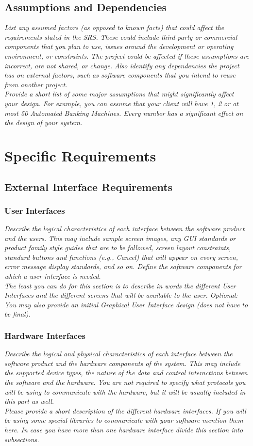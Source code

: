 \documentclass{article}
\newcommand{\gnl}{\vspace{1em}\\}      %
\begin{document}
    \subsection{Assumptions and Dependencies}
        \emph{List any assumed factors (as opposed to known facts) that could affect the requirements stated in the SRS. These could include third-party or commercial components that you plan to use, issues around the development or operating environment, or constraints. The project could be affected if these assumptions are incorrect, are not shared, or change. Also identify any dependencies the project has on external factors, such as software components that you intend to reuse from another project.\gnl Provide a short list of some major assumptions that might significantly affect your design. For example, you can assume that your client will have 1, 2 or at most 50 Automated Banking Machines. Every number has a significant effect on the design of your system.}
\pagebreak

\section{Specific Requirements}
    \subsection{External Interface Requirements}
        \subsubsection{User Interfaces}
            \emph{Describe the logical characteristics of each interface between the software product and the users. This may include sample screen images, any GUI standards or product family style guides that are to be followed, screen layout constraints, standard buttons and functions (e.g., Cancel) that will appear on every screen, error message display standards, and so on. Define the software components for which a user interface is needed.\gnl The least you can do for this section is to describe in words the different User Interfaces and the different screens that will be available to the user. Optional: You may also provide an initial Graphical User Interface design (does not have to be final).}
        \subsubsection{Hardware Interfaces}
            \emph{Describe the logical and physical characteristics of each interface between the software product and the hardware components of the system. This may include the supported device types, the nature of the data and control interactions between the software and the hardware. You are not required to specify what protocols you will be using to communicate with the hardware, but it will be usually included in this part as well.\gnl Please provide a short description of the different hardware interfaces. If you will be using some special libraries to communicate with your software mention them here. In case you have more than one hardware interface divide this section into subsections.}
\end{document}
